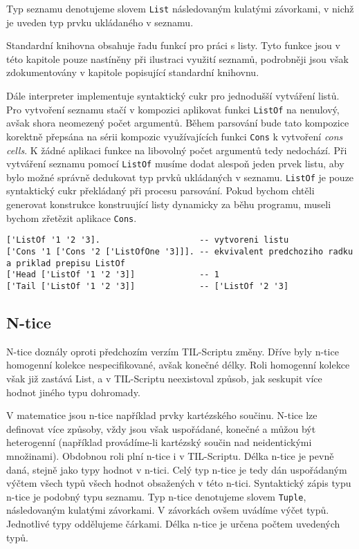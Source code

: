 Typ seznamu denotujeme slovem \lstinline{List} následovaným kulatými závorkami, v nichž je uveden
typ prvku ukládaného v seznamu.

Standardní knihovna obsahuje řadu funkcí pro práci s listy. Tyto funkce jsou v této kapitole pouze
nastíněny při ilustraci využití seznamů, podrobněji jsou však zdokumentovány v kapitole popisující
standardní knihovnu.

Dále interpreter implementuje syntaktický cukr pro jednodušší vytváření listů. Pro vytvoření
seznamu stačí v kompozici aplikovat funkci \lstinline{ListOf} na nenulový, avšak shora neomezený
počet argumentů. Během parsování bude tato kompozice korektně přepsána na sérii kompozic
využívajících funkci \lstinline{Cons} k vytvoření \textit{cons cells}. K žádné aplikaci funkce
na libovolný počet argumentů tedy nedochází. Při vytváření seznamu pomocí \lstinline{ListOf} musíme
dodat alespoň jeden prvek listu, aby bylo možné správně dedukovat typ prvků ukládaných v seznamu.
\lstinline{ListOf} je pouze syntaktický cukr překládaný při procesu parsování. Pokud bychom chtěli
generovat konstrukce konstruující listy dynamicky za běhu programu, museli bychom zřetězit aplikace
\lstinline{Cons}.

\begin{lstlisting}[caption={Příklad využití seznamů}]
['ListOf '1 '2 '3].                    -- vytvoreni listu
['Cons '1 ['Cons '2 ['ListOfOne '3]]]. -- ekvivalent predchoziho radku a priklad prepisu ListOf
['Head ['ListOf '1 '2 '3]]             -- 1
['Tail ['ListOf '1 '2 '3]]             -- ['ListOf '2 '3]
\end{lstlisting}

\subsection{N-tice}

N-tice doznály oproti předchozím verzím TIL-Scriptu změny. Dříve byly n-tice homogenní kolekce
nespecifikované, avšak konečné délky. Roli homogenní kolekce však již zastává List, a v TIL-Scriptu
neexistoval způsob, jak seskupit více hodnot jiného typu dohromady.

V matematice jsou n-tice například prvky kartézského součinu. N-tice lze definovat více způsoby,
vždy jsou však uspořádané, konečné a můžou být heterogenní (například provádíme-li kartézský součin
nad neidentickými množinami). Obdobnou roli plní n-tice i v TIL-Scriptu. Délka n-tice je pevně daná,
stejně jako typy hodnot v n-tici. Celý typ n-tice je tedy dán uspořádaným výčtem všech typů všech
hodnot obsažených v této n-tici. Syntaktický zápis typu n-tice je podobný typu seznamu. Typ n-tice
denotujeme slovem \lstinline{Tuple}, následovaným kulatými závorkami. V závorkách ovšem uvádíme
výčet typů. Jednotlivé typy oddělujeme čárkami. Délka n-tice je určena počtem uvedených typů.

